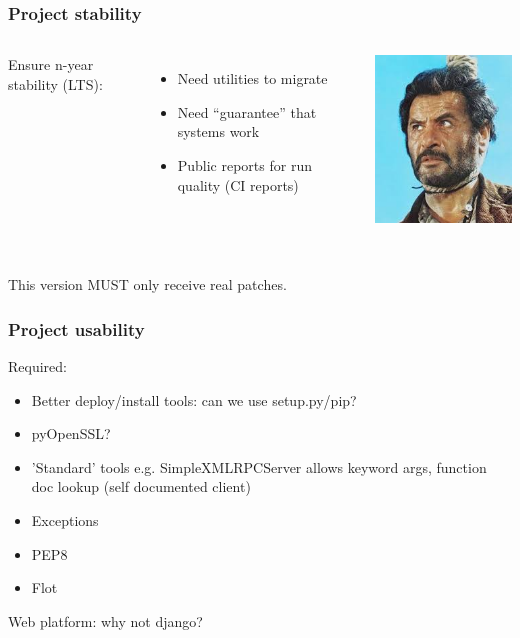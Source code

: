 \documentclass[14pt]{beamer}
\begin{document}
\begin{frame}
\frametitle{Project stability}
\begin{columns}
Ensure n-year stability (LTS):
\begin{itemize}
\item Need utilities to migrate
\item Need ``guarantee'' that systems work
\item Public reports for run quality (CI reports)
\end{itemize}
\includegraphics[width=\textwidth]{ugly.jpeg}
\end{columns}
~\\
This version \alert{MUST only} receive real patches.
\end{frame}

\begin{frame}
\frametitle{Project usability}
Required:
\begin{itemize}
\item Better deploy/install tools: can we use setup.py/pip?
\item pyOpenSSL?
\item 'Standard' tools e.g. SimpleXMLRPCServer allows keyword args, function doc lookup (self documented client)
\item Exceptions
\item PEP8
\item Flot
\end{itemize}
Web platform: why not django?
\end{frame}
\end{document}
